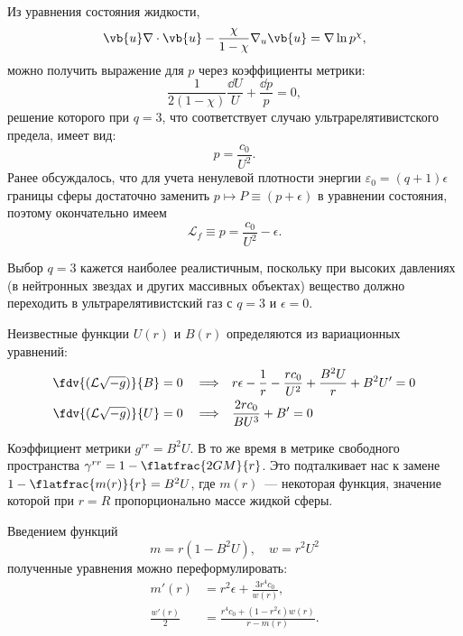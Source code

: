 \documentclass[\docroot/reports/draft/report.tex]{subfiles}
\begin{document}
    Из уравнения состояния жидкости,
    \begin{equation*}
        \vb{u} \nabla \cdot \vb{u} - \frac{\chi}{1 - \chi} \nabla_u \vb{u} = \nabla \ln p^{\chi} ,
    \end{equation*}
    можно получить выражение для $p$ через коэффициенты метрики:
    \begin{equation*}
        \frac{1}{2 (1 - \chi)} \frac{\dd{U}}{U} + \frac{\dd{p}}{p} = 0 ,
    \end{equation*}
    решение которого при $q = 3$, что соответствует случаю ультрарелятивистского предела, имеет вид:
    \begin{equation*}
        p = \frac{c_0}{U^2} .
    \end{equation*}
    Ранее обсуждалось, что для учета ненулевой плотности энергии $\varepsilon_0 = (q+1) \epsilon$ границы сферы достаточно заменить $p \mapsto P \equiv (p + \epsilon)$ в уравнении состояния, поэтому окончательно имеем
    \begin{equation*}
        \mathcal{L}_f \equiv p = \frac{c_0}{U^2} - \epsilon .
    \end{equation*}

    Выбор $q = 3$ кажется наиболее реалистичным, поскольку при высоких давлениях (в нейтронных звездах и других массивных объектах) вещество должно переходить в ультрарелятивистский газ \cite{oppenheimer_volkoff,burlankov_new_phys} с $q = 3$ и $\epsilon = 0$.

    Неизвестные функции $U(r)$ и $B(r)$ определяются из вариационных уравнений:
    \begin{align*}
        \fdv{(\mathcal{L}\sqrt{-g})}{B} = 0 \quad\Longrightarrow\quad&
            r \epsilon - \frac{1}{r} - \frac{r c_0}{U^2} + \frac{B^2 U}{r} + B^2 U' = 0 \\
        \fdv{(\mathcal{L}\sqrt{-g})}{U} = 0 \quad\Longrightarrow\quad&
            \frac{2 r c_0}{B U^3} + B' = 0
    \end{align*}

    Коэффициент метрики $g^{rr} = B^2 U$. В то же время в метрике свободного пространства $\gamma^{rr} = 1 - \flatfrac{2 G M}{r}$. Это подталкивает нас к замене $1 - \flatfrac{m(r)}{r} = B^2 U$, где $m(r)$~--- некоторая функция, значение которой при $r = R$ пропорционально массе жидкой сферы.

    Введением функций
    \begin{equation*}
        m = r (1 - B^2 U) , \quad w = r^2 U^2
    \end{equation*}
    полученные уравнения можно переформулировать:
    \begin{align*}
        m'(r) &= r^2 \epsilon + \frac{3 r^4 c_0}{w(r)} , \\
        \frac{w'(r)}{2} &= \frac{r^4 c_0 + (1 - r^2 \epsilon) w(r)}{r - m(r)} .
    \end{align*}
\end{document}
